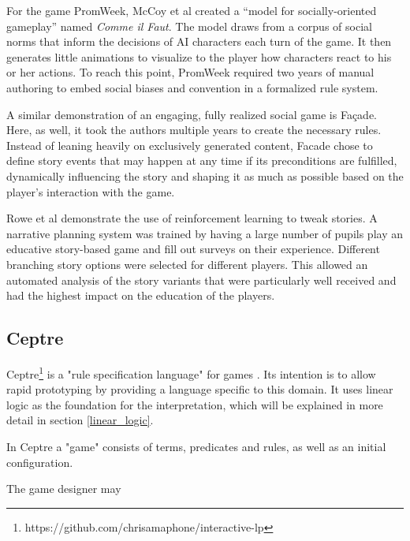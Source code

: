 For the game PromWeek, McCoy et al created a \enquote{model for socially-oriented gameplay} named \emph{Comme il Faut}.
The model draws from a corpus of social norms that inform the decisions of AI characters each turn of the game.
It then generates little animations to visualize to the player how characters react to his or her actions.
To reach this point, PromWeek required two years of manual authoring to embed social biases and convention in a formalized rule system. 

A similar demonstration of an engaging, fully realized social game is Façade.
Here, as well, it took the authors multiple years to create the necessary rules.
Instead of leaning heavily on exclusively generated content, Facade chose to define story events that may happen at any time if its preconditions are fulfilled, dynamically influencing the story and shaping it as much as possible based on the player's interaction with the game.

Rowe et al demonstrate the use of reinforcement learning to tweak stories.
A narrative planning system was trained by having a large number of pupils play an educative story-based game and fill out surveys on their experience.
Different branching story options were selected for different players.
This allowed an automated analysis of the story variants that were particularly well received and had the highest impact on the education of the players.

\subsection{Ceptre} 

Ceptre\footnote{https://github.com/chrisamaphone/interactive-lp} is a "rule specification language" for games \cite{martens_2015}.
Its intention is to allow rapid prototyping by providing a language specific to this domain.
It uses linear logic as the foundation for the interpretation, which will be explained in more detail in section \ref{linear_logic}.

In Ceptre a "game" consists of terms, predicates and rules, as well as an initial configuration.

The game designer may 
